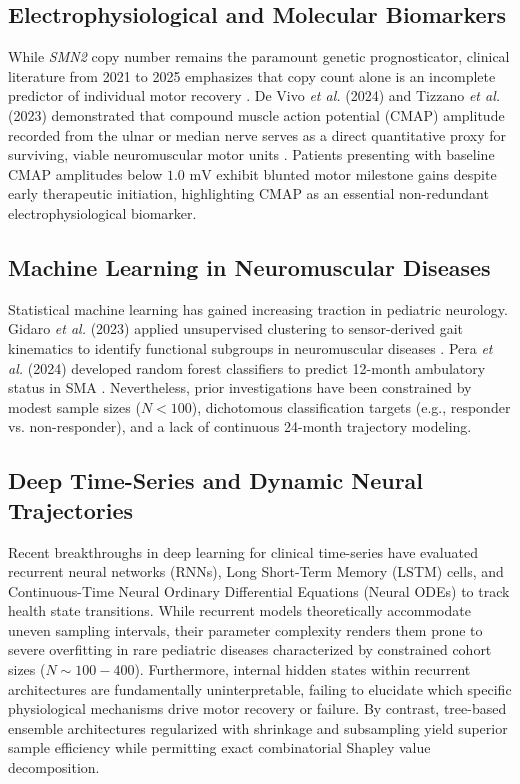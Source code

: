 \documentclass[journal]{IEEEtran}
\begin{document}
\subsection{Electrophysiological and Molecular Biomarkers}
While \textit{SMN2} copy number remains the paramount genetic prognosticator, clinical literature from 2021 to 2025 emphasizes that copy count alone is an incomplete predictor of individual motor recovery \cite{wirth2020twenty}. De Vivo \textit{et al.} (2024) and Tizzano \textit{et al.} (2023) demonstrated that compound muscle action potential (CMAP) amplitude recorded from the ulnar or median nerve serves as a direct quantitative proxy for surviving, viable neuromuscular motor units \cite{devivo2024compound,tizzano2023biomarkers}. Patients presenting with baseline CMAP amplitudes below $1.0\text{ mV}$ exhibit blunted motor milestone gains despite early therapeutic initiation, highlighting CMAP as an essential non-redundant electrophysiological biomarker.

\subsection{Machine Learning in Neuromuscular Diseases}
Statistical machine learning has gained increasing traction in pediatric neurology. Gidaro \textit{et al.} (2023) applied unsupervised clustering to sensor-derived gait kinematics to identify functional subgroups in neuromuscular diseases \cite{gidaro2023machine}. Pera \textit{et al.} (2024) developed random forest classifiers to predict 12-month ambulatory status in SMA \cite{pera2024machine}. Nevertheless, prior investigations have been constrained by modest sample sizes ($N < 100$), dichotomous classification targets (e.g., responder vs. non-responder), and a lack of continuous 24-month trajectory modeling.

\subsection{Deep Time-Series and Dynamic Neural Trajectories}
Recent breakthroughs in deep learning for clinical time-series have evaluated recurrent neural networks (RNNs), Long Short-Term Memory (LSTM) cells, and Continuous-Time Neural Ordinary Differential Equations (Neural ODEs) to track health state transitions. While recurrent models theoretically accommodate uneven sampling intervals, their parameter complexity renders them prone to severe overfitting in rare pediatric diseases characterized by constrained cohort sizes ($N \sim 100-400$). Furthermore, internal hidden states within recurrent architectures are fundamentally uninterpretable, failing to elucidate which specific physiological mechanisms drive motor recovery or failure. By contrast, tree-based ensemble architectures regularized with shrinkage and subsampling yield superior sample efficiency while permitting exact combinatorial Shapley value decomposition.
\end{document}

